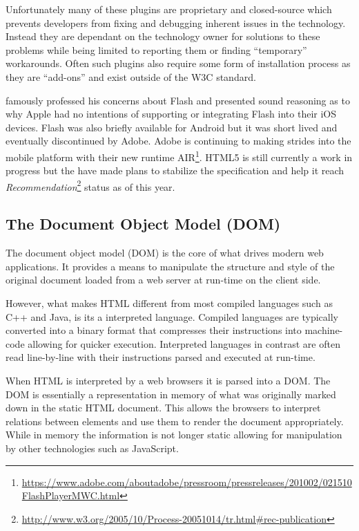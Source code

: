 \documentclass[final]{cmpreport}
\begin{document}
Unfortunately many of these plugins are proprietary and closed-source which prevents developers from fixing and debugging inherent issues in the technology. Instead they are dependant on the technology owner for solutions to these problems while being limited to reporting them or finding ``temporary'' workarounds. Often such plugins also require some form of installation process as they are ``add-ons'' and exist outside of the W3C standard. 

\citet{Jobs} famously professed his concerns about Flash and presented sound reasoning as to why Apple had no intentions of supporting or integrating Flash into their iOS devices. Flash was also briefly available for Android but it was short lived and eventually discontinued by Adobe. Adobe is continuing to making strides into the mobile platform with their new runtime AIR\footnote{\url{https://www.adobe.com/aboutadobe/pressroom/pressreleases/201002/021510FlashPlayerMWC.html}}. HTML5 is still currently a work in progress but the \citet{W3C} have made plans to stabilize the specification and help it reach \textit{Recommendation}\footnote{\url{http://www.w3.org/2005/10/Process-20051014/tr.html\#rec-publication}} status as of this year.

\subsection{The Document Object Model (DOM)}
The document object model (DOM) is the core of what drives modern web applications. It provides a means to manipulate the structure and style of the original document loaded from a web server at run-time on the client side.

However, what makes HTML different from most compiled languages such as C++ and Java, is its a interpreted language. Compiled languages are typically converted into a binary format that compresses their instructions into machine-code allowing for quicker execution. Interpreted languages in contrast are often read line-by-line with their instructions parsed and executed at run-time.

When HTML is interpreted by a web browsers it is parsed into a DOM. The DOM is essentially a representation in memory of what was originally marked down in the static HTML document. This allows the browsers to interpret relations between elements and use them to render the document appropriately. While in memory the information is not longer static allowing for manipulation by other technologies such as JavaScript.
\end{document}
